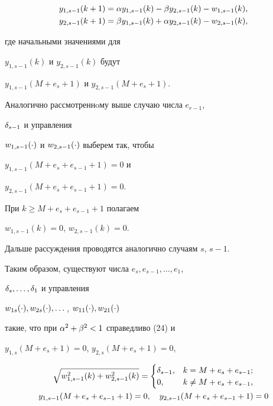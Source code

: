 \begin{align*}


y_{1,s-1}(k+1) &= \a y_{1,s-1}(k)-\b y_{2,s-1}(k) - w_{1,s-1}(k),\\


y_{2,s-1}(k+1) &= \b y_{1,s-1}(k)+\a y_{2,s-1}(k) - w_{2,s-1}(k),


\end{align*}


где начальными значениями для 


$y_{1,s-1}(k)$ и $y_{2,s-1}(k)$ будут 


$y_{1,s-1}(M+e_s+1)$ и $y_{2,s-1}(M+e_s+1)$.





Аналогично рассмотреннoму выше случаю числа $e_{r-1}$,


$\delta_{s-1}$ и управления


$w_{1,s-1}(\cdot)$ и $w_{2,s-1}(\cdot)$ выберем так, чтобы


$y_{1,s-1}(M+e_s+e_{s-1}+1) = 0$ и


$y_{2,s-1}(M+e_s+e_{s-1}+1) = 0$.


При $k \geq M+e_s+e_{s-1}+1$ полагаем


$w_{1,s-1}(k) = 0$, $w_{2,s-1}(k) = 0$.


Дальше рассуждения проводятся аналогично случаям $s$, $s-1$.





Таким образом, существуют числа $e_s, e_{s-1}, \dotsc, e_1$,


$\delta_s, \dotsc, \delta_1$  и управления


$w_{1s}(\cdot), w_{2s}(\cdot),\dotsc$, $w_{11}(\cdot), w_{21}(\cdot)$




такие, что при $\alpha^2+\beta^2 < 1$ справедливо (24) и


$y_{1,s}(M+e_s+1) = 0$, $y_{2,s}(M+e_s+1) = 0$,


\begin{gather}


\sqrt{w_{1,s-1}^2(k)+ w_{2,s-1}^2(k)} =


\begin{cases}


 \d_{s-1}, & k = M+e_s+e_{s-1};\\


 0, & k \neq M+e_s+e_{s-1},


\end{cases}


\\


%


y_{1,s-1}(M+e_s+e_{s-1}+1) = 0,\quad y_{2,s-1}(M+e_s+e_{s-1}+1)=0 \notag


\end{gather}


